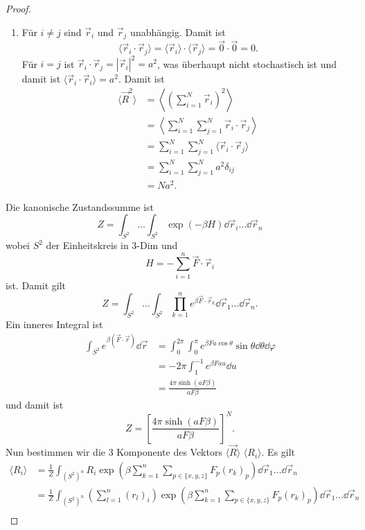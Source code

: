 \documentclass[prb,12pt]{revtex4-2}
\theoremstyle{definition}
\theoremstyle{definition}
\begin{document}
\begin{proof}
	\begin{enumerate}[label=\alph*)]
		\item Für $i\neq j$ sind $\vec{r}_i$ und $\vec{r}_j$ unabhängig. Damit ist
		\[\langle \vec{r}_i \cdot \vec{r}_j\rangle = \langle \vec{r}_i\rangle \cdot \langle \vec{r}_j\rangle = \vec{0}\cdot \vec{0}=0.\]
		F\"{u}r $i=j$ ist $\vec{r}_i\cdot \vec{r}_j= |\vec{r}_i|^2=a^2$, was überhaupt nicht stochastisch ist und damit ist $\langle \vec{r}_i \cdot \vec{r}_i\rangle = a^2$. Damit ist
		\begin{align*}
			\langle \vec{R}^2 \rangle &= \left\langle \left( \sum_{i=1}^N \vec{r}_i \right)^2 \right\rangle \\
			&= \left\langle \sum_{i=1}^N \sum_{j=1}^N \vec{r}_i \cdot \vec{r}_j \right\rangle\\
			&=\sum_{i=1}^N \sum_{j=1}^N \langle \vec{r}_i \cdot \vec{r}_j \rangle\\
			&=\sum_{i=1}^N \sum_{j=1}^N a^2 \delta_{ij}\\
			&= Na^2.
		\end{align*}
	\end{enumerate}
\item Die kanonische Zustandssumme ist
\[Z = \int_{S^2} \dots \int_{S^2} \exp\left(-\beta H\right)\dd{\vec{r}_i}\dots \dd{\vec{r}_n}\]
wobei $S^2$ der Einheitskreis in 3-Dim und
\[H = -\sum_{i=1}^n \vec{F}\cdot \vec{r}_i\]
ist. Damit gilt
\[
	Z = \int_{S^2}\dots \int_{S^2} \prod_{k=1}^n e^{\beta \vec{F}\cdot\vec{r}_k} \dd{\vec{r}_1} \dots \dd{\vec{r}_n}.\]
	Ein inneres Integral ist
	\begin{align*}
		\int_{S^2} e^{\beta(\vec{F}\cdot \vec{r})}\dd{\vec{r}} &= \int_0^{2\pi}\int_0^{\pi} e^{\beta F a \cos \theta}\sin\theta \dd{\theta}\dd{\varphi}\\
		&=-2\pi \int_1^{-1} e^{\beta F a u}\dd{u}\\
		&=\frac{4\pi \sinh (a F \beta)}{a F \beta}
	\end{align*}
und damit ist
\[Z = \left[\frac{4\pi \sinh (a F \beta)}{a F \beta}\right]^N.\]
Nun bestimmen wir die 3 Komponente des Vektors $\langle \vec{R}\rangle$ $\langle R_i\rangle$. Es gilt
\begin{align*}
	\langle R_i \rangle &= \frac 1Z \int_{(S^2)^n} R_i \exp\left(\beta \sum_{k=1}^n \sum_{p\in \{x,y,z\}} F_p (r_k)_p\right)\dd{\vec{r}_1}\dots \dd{\vec{r}_n}\\
	&= \frac 1Z \int_{(S^2)^n} \left(\sum_{l=1}^n (r_l)_i\right) \exp\left(\beta \sum_{k=1}^n \sum_{p\in \{x,y,z\}} F_p (r_k)_p\right)\dd{\vec{r}_1}\dots \dd{\vec{r}_n}\\

\end{align*}
\end{proof}
\end{document}
